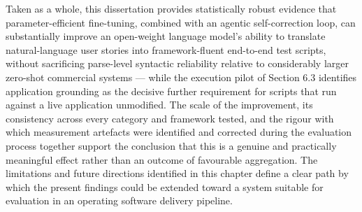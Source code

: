 Taken as a whole, this dissertation provides statistically robust
evidence that parameter-efficient fine-tuning, combined with an agentic
self-correction loop, can substantially improve an open-weight language
model's ability to translate natural-language user stories into
framework-fluent end-to-end test scripts, without sacrificing
parse-level syntactic reliability relative to considerably larger
zero-shot commercial systems --- while the execution pilot of Section
6.3 identifies application grounding as the decisive further requirement
for scripts that run against a live application unmodified. The scale
of the improvement, its consistency across every category and framework
tested, and the rigour with which measurement artefacts were identified
and corrected during the evaluation process together support the
conclusion that this is a genuine and practically meaningful effect
rather than an outcome of favourable aggregation. The limitations and
future directions identified in this chapter define a clear path by
which the present findings could be extended toward a system suitable
for evaluation in an operating software delivery pipeline.
